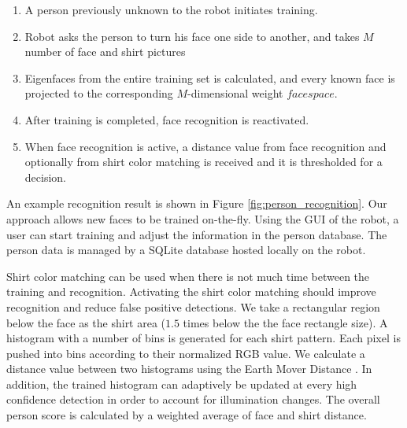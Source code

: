 \begin{enumerate}
\item A person previously unknown to the robot initiates training.
\item Robot asks the person to turn his face one side to another, and takes $M$ number of face and shirt pictures
\item Eigenfaces from the entire training set is calculated, and every known face is projected to the corresponding $M$-dimensional weight $facespace$.
\item After training is completed, face recognition is reactivated.
\item When face recognition is active, a distance value from face recognition and optionally from shirt color matching is received and it is thresholded for a decision.
\end{enumerate}

An example recognition result is shown in Figure \ref{fig:person_recognition}. Our approach allows new faces to be trained on-the-fly. Using the GUI of the robot, a user can start training and adjust the information in the person database. The person data is managed by a SQLite database hosted locally on the robot.

Shirt color matching can be used when there is not much time between the training and recognition. Activating the shirt color matching should improve recognition and reduce false positive detections. We take a rectangular region below the face as the shirt area ($1.5$ times below the the face rectangle size). A histogram with a number of bins is generated for each shirt pattern. Each pixel is pushed into bins according to their normalized RGB value. We calculate a distance value between two histograms using the Earth Mover Distance \cite{rubner1998metric}. In addition, the trained histogram can adaptively be updated at every high confidence detection in order to account for illumination changes. The overall person score is calculated by a weighted average of face and shirt distance.

